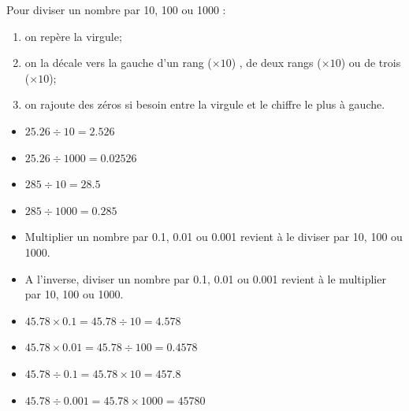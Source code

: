 \documentclass[12pt,a4paper]{article}
\begin{document}
	\begin{mymeth}
		Pour diviser un nombre par 10, 100 ou 1000 :
		\begin{enumerate}
			\item on repère la virgule;
			\item on la décale vers la gauche d'un rang ($\times 10$) , de deux rangs ($\times 10$) ou de trois ($\times 10$);
			\item on rajoute des zéros si besoin entre la virgule et le chiffre le plus à gauche.
		\end{enumerate}
	\end{mymeth}


	\begin{myexs}
		\begin{multicols}{2}
			\begin{itemize}
				\item $\num{25.26} \div 10 = \num{2.526}$ 
				\item $\num{25.26} \div 1000 = \num{0.02526} $
				\item $\num{285} \div 10 = \num{28.5} $ 
				\item $\num{285} \div 1000 = \num{0.285}$ 
			\end{itemize}	
		\end{multicols}
		
	\end{myexs}

	\begin{myprops}
		\begin{itemize}
			\item Multiplier un nombre par \num{0.1}, \num{0.01} ou \num{0.001} revient à le diviser par 10, 100 ou 1000.
			
			\item A l'inverse, diviser un nombre par \num{0.1}, \num{0.01} ou \num{0.001} revient à le multiplier par 10, 100 ou 1000.
		\end{itemize}
	\end{myprops}

	\begin{myexs}
			\begin{itemize}
				\item $\num{45.78} \times \num{0.1} = \num{45.78} \div \num{10} = \num{4.578}$ 
				\item $\num{45.78} \times \num{0.01} = \num{45.78} \div \num{100} = \num{0.4578}$ 
				\item $\num{45.78} \div \num{0.1} = \num{45.78} \times \num{10} = \num{457.8}$ 
				\item $\num{45.78} \div \num{0.001} = \num{45.78} \times \num{1000} = \num{45780}$ 
			\end{itemize}	
		
	\end{myexs}
\end{document}

